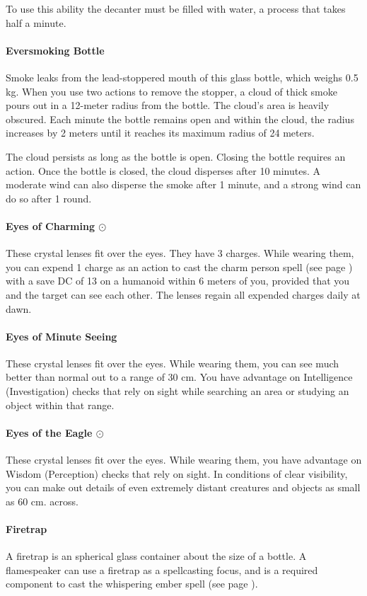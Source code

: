    To use this ability the decanter must be filled with water, a process that takes half a minute.
\paragraph{Eversmoking Bottle}
    Smoke leaks from the lead-stoppered mouth of this glass bottle, which weighs 0.5 kg.
    When you use two actions to remove the stopper, a cloud of thick smoke pours out in a 12-meter radius from the bottle.
    The cloud's area is heavily obscured.
    Each minute the bottle remains open and within the cloud, the radius increases by 2 meters until it reaches its maximum radius of 24 meters.

    The cloud persists as long as the bottle is open.
    Closing the bottle requires an action.
    Once the bottle is closed, the cloud disperses after 10 minutes.
    A moderate wind can also disperse the smoke after 1 minute, and a strong wind can do so after 1 round.
\paragraph{Eyes of Charming $\odot$}
    These crystal lenses fit over the eyes.
    They have 3 charges.
    While wearing them, you can expend 1 charge as an action to cast the charm person spell (see page \pageref{spell::charmperson}) with a save DC of 13 on a humanoid within 6 meters of you, provided that you and the target can see each other.
    The lenses regain all expended charges daily at dawn.
\paragraph{Eyes of Minute Seeing}
    These crystal lenses fit over the eyes.
    While wearing them, you can see much better than normal out to a range of 30 cm.
    You have advantage on Intelligence (Investigation) checks that rely on sight while searching an area or studying an object within that range.
\paragraph{Eyes of the Eagle $\odot$}
    These crystal lenses fit over the eyes.
    While wearing them, you have advantage on Wisdom (Perception) checks that rely on sight.
    In conditions of clear visibility, you can make out details of even extremely distant creatures and objects as small as 60 cm. across.
\paragraph{Firetrap}
    A firetrap is an spherical glass container about the size of a bottle.
    A flamespeaker can use a firetrap as a spellcasting focus, and is a required component to cast the whispering ember spell (see page \pageref{spell::whisperingember}).
